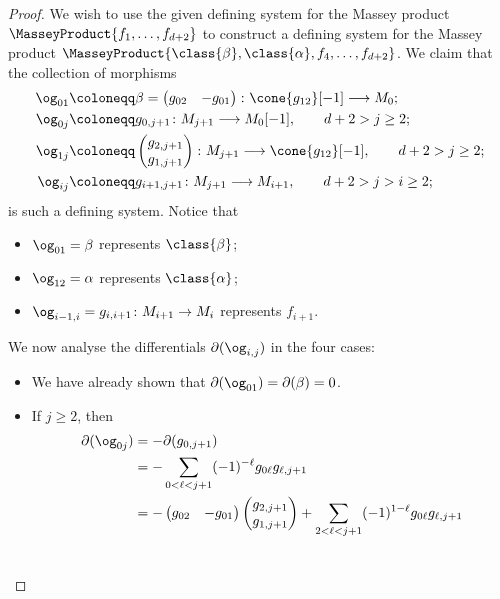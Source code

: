 \documentclass[a4paper]{amsart}
\begin{document}
\begin{proof}
  We wish to use the given defining system for the Massey product
  $\MasseyProduct{f_1,\dots,f_{d+2}}$ to construct a defining system for the
  Massey product
  $\MasseyProduct{\class{\beta},\class{\alpha},f_4,\dots,f_{d+2}}$. We claim
  that the collection of morphisms
  \begin{align*}
    \og_{01} & \coloneqq \beta = \begin{pmatrix}g_{02} & -g_{01}\end{pmatrix}\colon \cone{g_{12}}[-1]\longrightarrow M_0;                   \\
    \og_{0j} & \coloneqq g_{0,j+1}\colon M_{j+1}\longrightarrow M_0[-1],\qquad d+2>j\geq2;                                                      \\
    \og_{1j} & \coloneqq \begin{pmatrix}g_{2,j+1} \\g_{1,j+1}\end{pmatrix}\colon M_{j+1}\longrightarrow\cone{g_{12}}[-1],\qquad d+2>j\geq2; \\
    \og_{ij} & \coloneqq g_{i+1,j+1}\colon M_{j+1}\longrightarrow M_{i+1},\qquad d+2>j>i\geq2;
  \end{align*}
  is such a defining system. Notice that
  \begin{itemize}
  \item $\og_{01}=\beta$ represents $\class{\beta}$;
  \item $\og_{12}=\alpha$ represents $\class{\alpha}$;
  \item $\og_{i-1,i}=g_{i,i+1}\colon M_{i+1}\to M_i$ represents $f_{i+1}$.
  \end{itemize}
  We now analyse the differentials $\partial(\og_{i,j})$ in the four cases:
  \begin{itemize}
  \item We have already shown that $\partial(\og_{01})=\partial(\beta)=0$. \item
    If $j\geq2$, then
    \begin{align*}
      \partial(\og_{0j}) & =-\partial(g_{0,j+1})                                                                                                          \\ & =-\sum_{0<\ell<j+1}(-1)^{-\ell}g_{0\ell}g_{\ell,j+1} \\  &
                                                                                                                                                                                                                          =-\begin{pmatrix}g_{02} & -g_{01}\end{pmatrix}\begin{pmatrix}g_{2,j+1} \\g_{1,j+1}\end{pmatrix}+\sum_{2<\ell<j+1}(-1)^{1-\ell}g_{0\ell}g_{\ell,j+1} \\                       &

\end{align*}
\end{itemize}
\end{proof}
\end{document}
